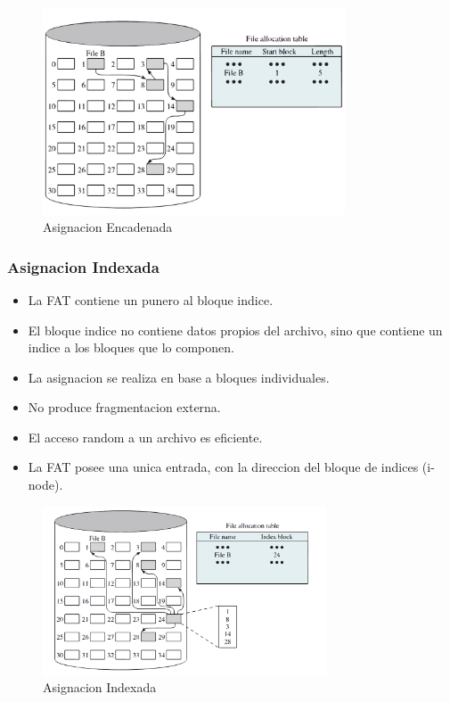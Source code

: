 \documentclass[12pt]{article}
\begin{document}
\begin{figure}[h]
    \begin{center}
        \includegraphics[width=0.80\textwidth]{assets/AsignacionEncadenada.pdf}
    \end{center}
    \caption{Asignacion Encadenada}
    \label{fig:4}
\end{figure}


\subsubsection{Asignacion Indexada}
\begin{itemize}
    \item La FAT contiene un punero al bloque indice.
    \item El bloque indice no contiene datos propios del archivo, sino que contiene un indice a los bloques que lo componen.
    \item La asignacion se realiza en base a bloques individuales.
    \item No produce fragmentacion externa.
    \item El acceso random a un archivo es eficiente.
    \item La FAT posee una unica entrada, con la direccion del bloque de indices (i-node).
\end{itemize}

\pagebreak

\begin{figure}[h]
    \begin{center}
        \includegraphics[width=0.75\textwidth]{assets/AsignacionIndexada.pdf}
    \end{center}
    \caption{Asignacion Indexada}
    \label{fig:5}
\end{figure}
\end{document}

